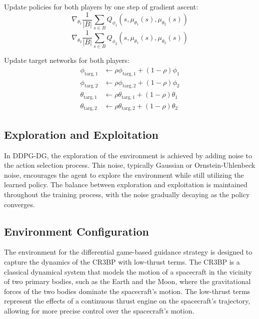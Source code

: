 \documentclass[conference]{IEEEtran}
\begin{document}
\begin{algorithm}[H]
\begin{algorithmic}[1]
                \STATE Update policies for both players by one step of gradient ascent:
                \begin{equation*}
                    \nabla_{\theta_1} \frac{1}{|B|} \sum_{s \in B} Q_{\phi_1}(s, \mu_{\theta_1}(s), \mu_{\theta_2}(s))
                \end{equation*}
                \begin{equation*}
                    \nabla_{\theta_2} \frac{1}{|B|} \sum_{s \in B} Q_{\phi_2}(s, \mu_{\theta_1}(s), \mu_{\theta_2}(s))
                \end{equation*}

                \STATE Update target networks for both players:
                \begin{align*}
                    \phi_{\text{targ},1} &\leftarrow \rho \phi_{\text{targ},1} + (1 - \rho) \phi_1 \\
                    \phi_{\text{targ},2} &\leftarrow \rho \phi_{\text{targ},2} + (1 - \rho) \phi_2 \\
                    \theta_{\text{targ},1} &\leftarrow \rho \theta_{\text{targ},1} + (1 - \rho) \theta_1 \\
                    \theta_{\text{targ},2} &\leftarrow \rho \theta_{\text{targ},2} + (1 - \rho) \theta_2
                \end{align*}
            \ENDFOR
        \ENDIF
\end{algorithmic}
\end{algorithm}





\subsection{Exploration and Exploitation}
In DDPG-DG, the exploration of the environment is achieved by adding noise to the action selection process. This noise, typically Gaussian or Ornstein-Uhlenbeck noise, encourages the agent to explore the environment while still utilizing the learned policy. The balance between exploration and exploitation is maintained throughout the training process, with the noise gradually decaying as the policy converges.






\subsection{Environment Configuration}
The environment for the differential game-based guidance strategy is designed to capture the dynamics of the CR3BP with low-thrust terms. The CR3BP is a classical dynamical system that models the motion of a spacecraft in the vicinity of two primary bodies, such as the Earth and the Moon, where the gravitational forces of the two bodies dominate the spacecraft's motion. The low-thrust terms represent the effects of a continuous thrust engine on the spacecraft's trajectory, allowing for more precise control over the spacecraft's motion.
\end{document}
